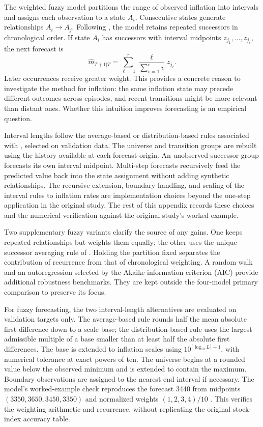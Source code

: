 \documentclass[11pt,a4paper]{article}
\begin{document}
The weighted fuzzy model partitions the range of observed inflation into intervals and assigns each observation to a state $A_i$. Consecutive states generate relationships $A_i\rightarrow A_j$. Following \citet{yu2005}, the model retains repeated successors in chronological order. If state $A_i$ has successors with interval midpoints $z_{j_1},\ldots,z_{j_r}$, the next forecast is
\begin{equation}
 \widehat m_{T+1|T}=
 \sum_{\ell=1}^{r}\frac{\ell}{\sum_{v=1}^{r}v}z_{j_\ell}.
 \label{eq:fuzzy}
\end{equation}
Later occurrences receive greater weight. This provides a concrete reason to investigate the method for inflation: the same inflation state may precede different outcomes across episodes, and recent transitions might be more relevant than distant ones. Whether this intuition improves forecasting is an empirical question.

Interval lengths follow the average-based or distribution-based rules associated with \citet{huarng2001}, selected on validation data. The universe and transition groups are rebuilt using the history available at each forecast origin. An unobserved successor group forecasts its own interval midpoint. Multi-step forecasts recursively feed the predicted value back into the state assignment without adding synthetic relationships. The recursive extension, boundary handling, and scaling of the interval rules to inflation rates are implementation choices beyond the one-step application in the original study. The rest of this appendix records these choices and the numerical verification against the original study's worked example.

Two supplementary fuzzy variants clarify the source of any gains. One keeps repeated relationships but weights them equally; the other uses the unique-successor averaging rule of \citet{chen1996}. Holding the partition fixed separates the contribution of recurrence from that of chronological weighting. A random walk and an autoregression selected by the Akaike information criterion (AIC) provide additional robustness benchmarks. They are kept outside the four-model primary comparison to preserve its focus.

For fuzzy forecasting, the two interval-length alternatives are evaluated on validation targets only. The average-based rule rounds half the mean absolute first difference down to a scale base; the distribution-based rule uses the largest admissible multiple of a base smaller than at least half the absolute first differences. The base is extended to inflation scales using $10^{\lceil\log_{10} L\rceil-1}$, with numerical tolerance at exact powers of ten. The universe begins at a rounded value below the observed minimum and is extended to contain the maximum. Boundary observations are assigned to the nearest end interval if necessary. The model's worked-example check reproduces the forecast 3440 from midpoints $(3350,3650,3450,3350)$ and normalized weights $(1,2,3,4)/10$ \citep{yu2005}. This verifies the weighting arithmetic and recurrence, without replicating the original stock-index accuracy table.
\end{document}
